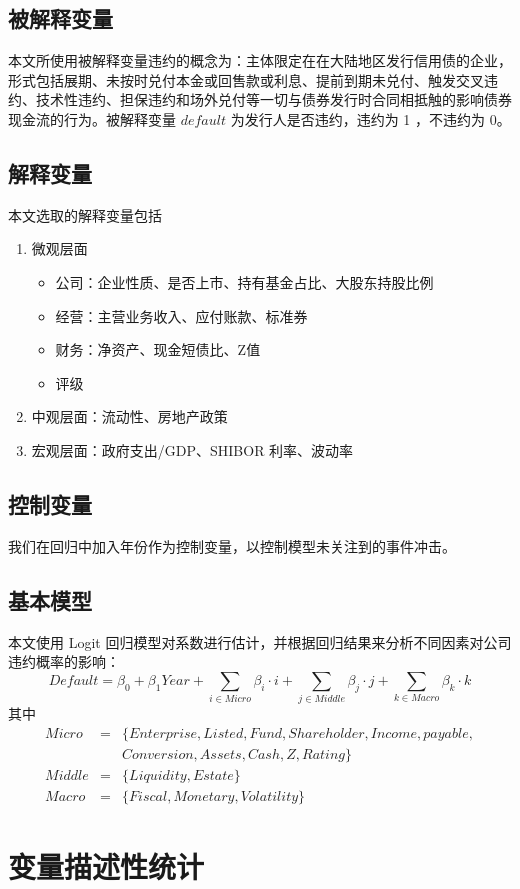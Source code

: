 \subsection{被解释变量}
本文所使用被解释变量违约的概念为：主体限定在在大陆地区发行信用债的企业，形式包括展期、未按时兑付本金或回售款或利息、提前到期未兑付、触发交叉违约、技术性违约、担保违约和场外兑付等一切与债券发行时合同相抵触的影响债券现金流的行为。被解释变量 \(default\) 为发行人是否违约，违约为 1 ，不违约为 0。

\subsection{解释变量}
本文选取的解释变量包括
\begin{enumerate}
	\item 微观层面
	      \begin{itemize}
		      \item 公司：企业性质、是否上市、持有基金占比、大股东持股比例
		      \item 经营：主营业务收入、应付账款、标准券
		      \item 财务：净资产、现金短债比、Z值
		      \item 评级
	      \end{itemize}
	\item 中观层面：流动性、房地产政策
	\item 宏观层面：政府支出/GDP、SHIBOR 利率、波动率
\end{enumerate}

\subsection{控制变量}
我们在回归中加入年份作为控制变量，以控制模型未关注到的事件冲击。



\subsection{基本模型}
本文使用 Logit 回归模型对系数进行估计，并根据回归结果来分析不同因素对公司违约概率的影响：
\begin{equation}
  Default = \beta_0+ \beta_1Year+\sum_{i\in Micro}\beta_i\cdot i+\sum_{j\in Middle}\beta_j\cdot j+\sum_{k\in Macro}\beta_k\cdot k
\end{equation}
其中
\begin{eqnarray}
  Micro&=&\{Enterprise, Listed, Fund, Shareholder, Income, payable,\nonumber\\
          & & Conversion, Assets, Cash, Z, Rating\} \nonumber\\
	Middle&=&\{Liquidity, Estate\} \nonumber\\
	Macro&=&\{Fiscal, Monetary, Volatility\} \nonumber
\end{eqnarray}
\section{变量描述性统计}

